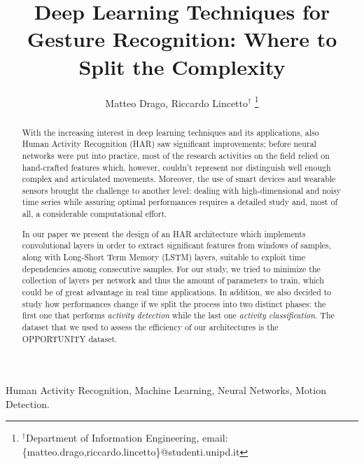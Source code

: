 \documentclass[10pt, conference, journal]{IEEEtran}
\title{Deep Learning Techniques for Gesture Recognition: Where to Split the Complexity}
\author{Matteo Drago, Riccardo Lincetto$^\dag$
\thanks{$^\dag$Department of Information Engineering, email: \{matteo.drago,riccardo.lincetto\}@studenti.unipd.it}
}
\begin{document}
\maketitle

\begin{abstract}
	
With the increasing interest in deep learning techniques and its applications, also Human Activity Recognition (HAR) saw significant improvements; before neural networks were put into practice, most of the research activities on the field relied on hand-crafted features which, however, couldn't represent nor distinguish well enough complex and articulated movements. Moreover, the use of smart devices and wearable sensors brought the challenge to another level: dealing with high-dimensional and noisy time series while assuring optimal performances requires a detailed study and, most of all, a considerable computational effort.

In our paper we present the design of an HAR architecture which implements convolutional layers in order to extract significant features from windows of samples, along with Long-Short Term Memory (LSTM) layers, suitable to exploit time dependencies among consecutive samples. For our study, we tried to minimize the collection of layers per network and thus the amount of parameters to train, which could be of great advantage in real time applications. In addition, we also decided to study how performances change if we split the process into two distinct phases: the first one that performs \textit{activity detection} while the last one \textit{activity classification}. The dataset that we used to assess the efficiency of our architectures is the OPPORTUNITY dataset.

\end{abstract}

\IEEEkeywords
Human Activity Recognition, Machine Learning, Neural Networks, Motion Detection. 
\endIEEEkeywords














\end{document}
